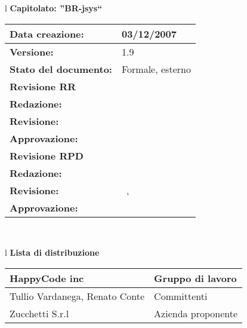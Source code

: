 

\newcommand{\lv}{ 1.9 } %
\newcommand{\dt}{ Glossario }%


\begin{center}
\thispagestyle{plain}
\begin{table}[htbp]
\large{
\begin{tabular}{l}
\Large{\textbf{\textsf{Capitolato: ''BR-jsys``}}} \\
\begin{tabular}{|p{6cm}|p{6cm}|}
\hline
\textbf{Data creazione:} & 03/12/2007 \\ \hline
\textbf{Versione:} & \lv \\ \hline
\textbf{Stato del documento:} & Formale, esterno \\ \hline
\textbf{Revisione RR} & \\ \hline
\textbf{Redazione:} & \MB \\ \hline
\textbf{Revisione:} & \MT \\ \hline
\textbf{Approvazione:}  & \ET \\ \hline
\textbf{Revisione RPD} & \\ \hline
\textbf{Redazione:} & \LA \\ \hline
\textbf{Revisione:} & \AT\ , \MB  \\ \hline
\textbf{Approvazione:}  & \MB \\ \hline
\end{tabular} \\
\end{tabular}
}
\end{table}

\begin{table}[hbtp]
\large{
\begin{tabular}{l}
\Large{\textbf{\textsf{Lista di distribuzione}}} \\
\begin{tabular}{|p{6cm}|p{6cm}|} \hline
{HappyCode inc}& Gruppo di lavoro \\ \hline
{Tullio Vardanega, Renato Conte}& Committenti \\ \hline 
{Zucchetti S.r.l}& Azienda proponente\\ \hline
\end{tabular} \\
\end{tabular}
}
\end{table}
\begin{table}[hbtp]


\end{table}
\end{center}
